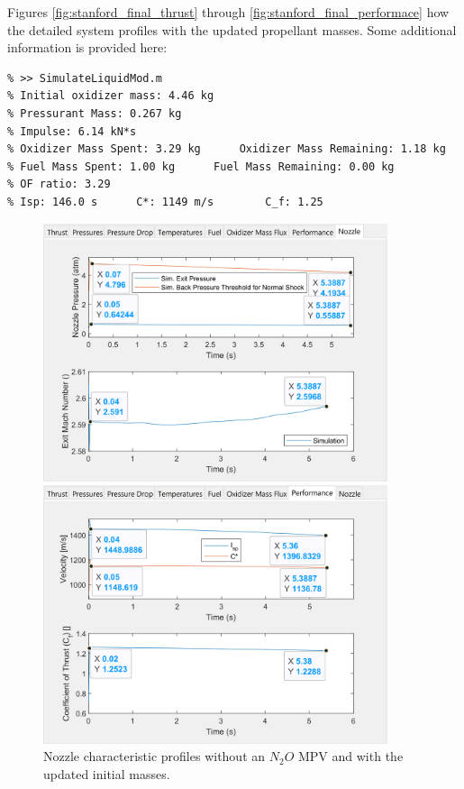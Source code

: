 \documentclass[9pt]{article} %
\numberwithin{equation}{section} %
\begin{document}
Figures \ref{fig:stanford_final_thrust} through \ref{fig:stanford_final_performace} how the detailed system profiles with the updated propellant masses. Some additional information is provided here:
\begin{lstlisting}
% >> SimulateLiquidMod.m
% Initial oxidizer mass: 4.46 kg
% Pressurant Mass: 0.267 kg
% Impulse: 6.14 kN*s		
% Oxidizer Mass Spent: 3.29 kg		Oxidizer Mass Remaining: 1.18 kg
% Fuel Mass Spent: 1.00 kg		Fuel Mass Remaining: 0.00 kg
% OF ratio: 3.29 
% Isp: 146.0 s		C*: 1149 m/s		C_f: 1.25
\end{lstlisting}

\begin{figure}[H]
    \centering
    \begin{minipage}{0.49\textwidth}
        \centering
        \includegraphics[scale=0.5, width=0.9\textwidth, trim={0cm 0cm 0cm 0cm}, clip]{system_sim_files/stanford_final_nozzle.png} %
        \caption{Nozzle characteristic profiles without an $N_{2}O$ MPV and with the updated initial masses.}
        \label{fig:stanford_final_nozzle}
    \end{minipage}\hfill
    \begin{minipage}{0.49\textwidth}
        \centering
        \includegraphics[scale=0.5, width=0.9\textwidth, trim={0cm 0cm 0cm 0cm}, clip]{system_sim_files/stanford_final_performance.png} %

\end{minipage}
\end{figure}
\end{document}
